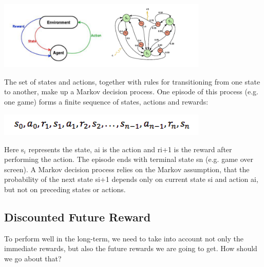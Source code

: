 \documentclass[twoside,letterpaper]{article}
\begin{document}
{{\begin{centering}
\includegraphics[width=10cm]{images/mdp.png}\\
\end{centering}
The set of states and actions, together with rules for transitioning from one state to another, make up a Markov decision process. One episode of this process (e.g. one game) forms a finite sequence of states, actions and rewards:\\
\begin{centering}
\includegraphics[width=10cm]{images/mdp2.png}\\
\end{centering}
Here s$_{i}$ represents the state, ai is the action and ri+1 is the reward after performing the action. The episode ends with terminal state sn (e.g. game over screen). A Markov decision process relies on the Markov assumption, that the probability of the next state si+1 depends only on current state si and action ai, but not on preceding states or actions.
}

\subsection[Discounted Future Reward]{\rmfamily\bfseries\color{black}
Discounted Future Reward}

{\color{black}
To perform well in the long-term, we need to take into account not only the immediate rewards, but also the future rewards we are going to get. How should we go about that?\\

}}
\end{document}
